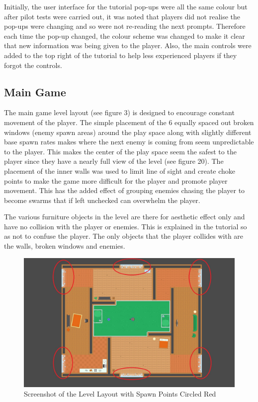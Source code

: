 \documentclass[journal]{IEEEtran}
\begin{document}
Initially, the user interface for the tutorial pop-ups were all the same colour but after pilot tests were carried out, it was noted that players did not realise the pop-ups were changing and so were not re-reading the next prompts. Therefore each time the pop-up changed, the colour scheme was changed to make it clear that new information was being given to the player. Also, the main controls were added to the top right of the tutorial to help less experienced players if they forgot the controls. 

\subsection{Main Game}
The main game level layout (see figure 3) is designed to encourage constant movement of the player. The simple placement of the 6 equally spaced out broken windows (enemy spawn areas) around the play space along with slightly different base spawn rates makes where the next enemy is coming from seem unpredictable to the player. This makes the center of the play space seem the safest to the player since they have a nearly full view of the level (see figure 20). The placement of the inner walls was used to limit line of sight and create choke points to make the game more difficult for the player and promote player movement. This has the added effect of grouping enemies chasing the player to become swarms that if left unchecked can overwhelm the player.

The various furniture objects in the level are there for aesthetic effect only and have no collision with the player or enemies. This is explained in the tutorial so as not to confuse the player. The only objects that the player collides with are the walls, broken windows and enemies.


\begin{figure}[h]
	\includegraphics[width=1.0\linewidth]{artefactscreenshotlevelspawns.jpg}
	\caption{Screenshot of the Level Layout with Spawn Points Circled Red}
	\label{Analysis Test}
\end{figure} 
\end{document}
